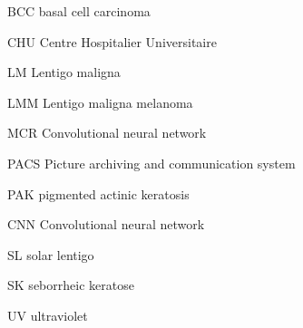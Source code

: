 

            {BCC}
            {basal cell carcinoma}
            
            {CHU}
            {Centre Hospitalier Universitaire}
            
            {LM}
            {Lentigo maligna}
            
            {LMM}
            {Lentigo maligna melanoma}
            
            {MCR}
            {Convolutional neural network}

            {PACS}
            {Picture archiving and communication system}
         
            {PAK}
            {pigmented actinic keratosis}
            
            {CNN}
            {Convolutional neural network}
            
            {SL}
            {solar lentigo}
            
            {SK}
            {seborrheic keratose}
            
            {UV}
            {ultraviolet}